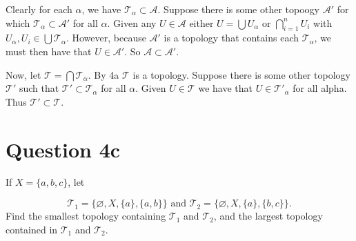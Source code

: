 \documentclass[11pt, oneside]{article}   	%
\begin{document}
Clearly for each $\alpha$, we have $\mathscr{T}_\alpha \subset \mathscr{A}$. Suppose there is some other topoogy $\mathscr{A}'$ for which $\mathscr{T}_\alpha \subset \mathscr{A}'$ for all $\alpha$. Given any $U \in \mathscr{A}$ either $U =  \bigcup U_{\alpha}$ or $\bigcap_{i=1}^n U_i$ with $U_\alpha, U_i \in \bigcup \mathscr{T}_\alpha$. However, because $\mathscr{A}'$ is a topology that contains each $\mathscr{T}_\alpha$, we must then have that $U \in \mathscr{A}'$. So $\mathscr{A} \subset \mathscr{A}'$.

Now, let $\mathscr{T} = \bigcap \mathscr{T}_\alpha$. By 4a $\mathscr{T}$ is a topology. Suppose there is some other topology $\mathscr{T}'$ such that $\mathscr{T}' \subset \mathscr{T}_\alpha$ for all $\alpha$. Given $U \in \mathscr{T}$ we have that $U \in \mathscr{T}'_\alpha$ for all alpha. Thus $\mathscr{T}' \subset \mathscr{T}$.


\section*{Question 4c}
If $X = \{a,b,c\}$, let

\[
\mathscr{T}_1 = \{\varnothing, X, \{a\}, \{a,b\}\} \text{ and } \mathscr{T}_2 = \{ \varnothing, X, \{a\}, \{b,c \}\}.
\]
Find the smallest topology containing $ \mathscr{T}_1$ and $\mathscr{T}_2$, and the largest topology contained in $ \mathscr{T}_1$ and $\mathscr{T}_2$.
\end{document}

